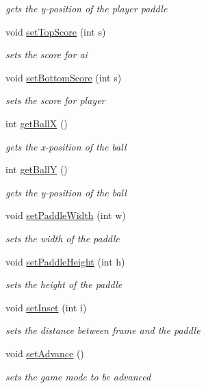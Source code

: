 \begin{DoxyCompactItemize}
\begin{DoxyCompactList}\small\item\em gets the y-\/position of the player paddle \end{DoxyCompactList}\item 
void \hyperlink{classview_1_1_pong_game_display_a04bcc8b60d85f38178d2cd817e3fbd39}{set\+Top\+Score} (int s)
\begin{DoxyCompactList}\small\item\em sets the score for ai \end{DoxyCompactList}\item 
void \hyperlink{classview_1_1_pong_game_display_aa1ef677f1bae92a51750732099b1609a}{set\+Bottom\+Score} (int s)
\begin{DoxyCompactList}\small\item\em sets the score for player \end{DoxyCompactList}\item 
int \hyperlink{classview_1_1_pong_game_display_a83584a112f5bd8877e1bbb1d74dfa080}{get\+BallX} ()
\begin{DoxyCompactList}\small\item\em gets the x-\/position of the ball \end{DoxyCompactList}\item 
int \hyperlink{classview_1_1_pong_game_display_a940198a68c987548b182d18069ba5885}{get\+BallY} ()
\begin{DoxyCompactList}\small\item\em gets the y-\/position of the ball \end{DoxyCompactList}\item 
void \hyperlink{classview_1_1_pong_game_display_ac42d38f9ed29e2ab2bec6c7da46f1c0e}{set\+Paddle\+Width} (int w)
\begin{DoxyCompactList}\small\item\em sets the width of the paddle \end{DoxyCompactList}\item 
void \hyperlink{classview_1_1_pong_game_display_a5c855e1e459838b82e976cd957da5cc5}{set\+Paddle\+Height} (int h)
\begin{DoxyCompactList}\small\item\em sets the height of the paddle \end{DoxyCompactList}\item 
void \hyperlink{classview_1_1_pong_game_display_ac40ce3811b6118c530980d38aa48ec64}{set\+Inset} (int i)
\begin{DoxyCompactList}\small\item\em sets the distance between frame and the paddle \end{DoxyCompactList}\item 
void \hyperlink{classview_1_1_pong_game_display_a0fedbf41897932915b12f67542cb7695}{set\+Advance} ()
\begin{DoxyCompactList}\small\item\em sets the game mode to be advanced \end{DoxyCompactList}\end{DoxyCompactItemize}
